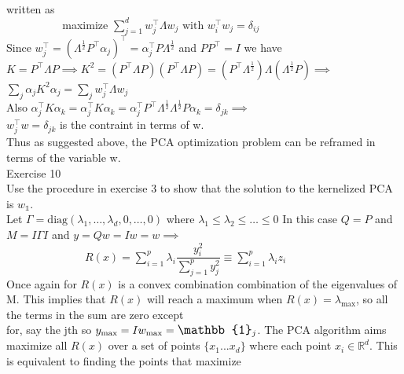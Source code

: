 \documentclass[18pt]{article}
\begin{document}
\begin{flushleft}
written as\\
\vspace{.4cm}
$\hspace{2cm}$ maximize $\sum\limits_{j=1}^d w_j^{\top} \Lambda w_j \text{ with } w_i^{\top}w_j=\delta_{ij}$\\
\vspace{.4cm}
Since $w_j^{\top}=(\Lambda^{\frac{1}{2}} P^{\top} \alpha_j)^{\top}=\alpha_j^{\top} P \Lambda^{\frac{1}{2}}$ and $PP^{\top}=I$ we have\\
\vspace{.4cm}
$K=P^{\top} \Lambda P \implies K^2=(P^{\top} \Lambda P)(P^{\top} \Lambda P)=(P^{\top}\Lambda^{\frac{1}{2}}) \Lambda (\Lambda^{\frac{1}{2}} P)\implies$\\
\vspace{.4cm}
$\sum\limits_j \alpha_j K^2 \alpha_j=\sum\limits_j w_j^{\top} \Lambda w_j$\\
Also $\alpha_j^{\top}K\alpha_k=\alpha_j^{\top}K\alpha_k=\alpha_j^{\top} P^{\top} \Lambda^{\frac{1}{2}}\Lambda^{\frac{1}{2}} P \alpha_k =\delta_{jk} \implies$\\
$w_j^{\top}w =\delta_{jk}$ is the contraint in terms of w.\\
\vspace{.4cm}
Thus as suggested above, the PCA optimization problem can be reframed in terms of the variable w.\\
\vspace{.4cm}
Exercise 10\\
Use the procedure in exercise 3 to show that the solution to the kernelized PCA is $w_{\mathbb{1}}$.\\
\vspace{.4cm}
Let $\Gamma=\text{diag}(\lambda_1,\dots,\lambda_d,0,\dots,0)$ where $\lambda_1 \leq \lambda_2 \leq \dots \leq 0$
In this case $Q=P$ and $M=I \Gamma I$ and $y=Qw=Iw=w \implies$ \\
\vspace{.4cm}
$\hspace{3cm} R(x)=\sum\limits_{i=1}^p \lambda_i\dfrac{ y_i^2}{\sum\limits_{j=1}^p y_j^2}\equiv \sum\limits_{i=1}^p \lambda_i z_i$\\
\vspace{.4cm}
Once again for $R(x)$ is a convex combination combination of the eigenvalues of M. This implies that $R(x)$ will reach a maximum when $R(x)=\lambda_{\max}$, so all the terms in the sum are zero except\\
for, say the jth so $y_{\max}=Iw_{\max}=\large{\mathbb{1}}_j$. The PCA algorithm aims maximize all $R(x)$ over a set of points $\{x_1...x_d\}$ where each point $x_i \in \mathbb{R}^d$. This is equivalent to finding the points that maximize\\

\end{flushleft}
\end{document}
